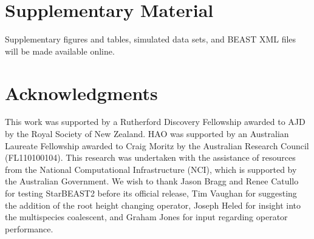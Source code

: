 \documentclass[12pt]{article}
\begin{document}
\section*{Supplementary Material}

Supplementary figures and tables, simulated data sets, and BEAST XML files will
be made available online.

\section*{Acknowledgments}

This work was supported by a Rutherford Discovery Fellowship awarded to AJD by
the Royal Society of New Zealand. HAO was supported by an Australian Laureate
Fellowship awarded to Craig Moritz by the Australian Research Council
(FL110100104). This research was undertaken with the assistance of resources
from the National Computational Infrastructure (NCI), which is supported by the
Australian Government. We wish to thank Jason Bragg and Renee Catullo for
testing StarBEAST2 before its official release, Tim Vaughan for suggesting the
addition of the root height changing operator, Joseph Heled for insight into the
multispecies coalescent, and Graham Jones for input regarding operator
performance.

\clearpage



\end{document}
